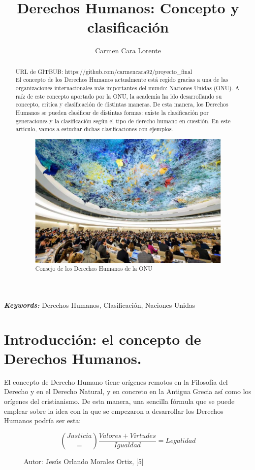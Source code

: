 \documentclass[10pt,a4paper]{article}
\begin{document}
\title{Derechos Humanos: Concepto y clasificación}
\author{Carmen Cara Lorente}
\date{}
\maketitle
\providecommand{\keywords}[1]{\textbf{\textit{Keywords:}} #1}
\begin{abstract}
URL de GITBUB: https://github.com/carmencara92/proyecto\_final\\

El concepto de los Derechos Humanos actualmente está regido gracias a una de las organizaciones internacionales más importantes del mundo: Naciones Unidas (ONU). A raíz de este concepto aportado por la ONU, la academia ha ido desarrollando su concepto, crítica y clasificación de distintas maneras. De esta manera, los Derechos Humanos se pueden clasificar de distintas formas: existe la clasificación por generaciones y la clasificación según el tipo de derecho humano en cuestión. En este artículo, vamos a estudiar dichas clasificaciones con ejemplos.

\begin{figure}
\centering
\includegraphics{unhumanrightscouncil}
\caption{Consejo de los Derechos Humanos de la ONU}
\end{figure}
\end{abstract}
\keywords{Derechos Humanos, Clasificación, Naciones Unidas}
\newpage
\section{Introducción: el concepto de Derechos Humanos.}
El concepto de Derecho Humano tiene orígenes remotos en la Filosofía del Derecho y en el Derecho Natural, y en concreto en la Antigua Grecia así como los orígenes del cristianismo. De esta manera, una sencilla fórmula que se puede emplear sobre la idea con la que se empezaron a desarrollar los Derechos Humanos podría ser esta:
\begin{figure}[h]
\[
    \binom {Justicia} = \frac{Valores+Virtudes}{Igualdad}= {Legalidad}
\]
\caption{Autor: Jesús Orlando Morales Ortiz, [5]}
\end{figure}
\end{document}
